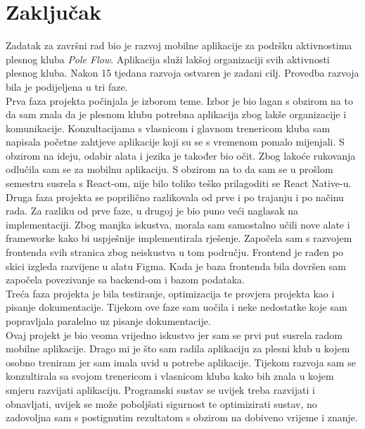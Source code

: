 \documentclass[times, utf8, zavrsni]{fer}
\begin{document}
\chapter{Zaključak}
    Zadatak za završni rad bio je razvoj mobilne aplikacije za podršku aktivnostima plesnog kluba \textit{Pole Flow}. Aplikacija služi lakšoj organizaciji svih aktivnosti plesnog kluba. Nakon 15 tjedana razvoja ostvaren je zadani cilj. Provedba razvoja bila je podijeljena u tri faze.\\
    Prva faza projekta počinjala je izborom teme. Izbor je bio lagan s obzirom na to da sam znala da je plesnom klubu potrebna aplikacija zbog lakše organizacije i komunikacije. Konzultacijama s vlasnicom i glavnom trenericom kluba sam napisala početne zahtjeve aplikacije koji su se s vremenom pomalo mijenjali. S obzirom na ideju, odabir alata i jezika je također bio očit. Zbog lakoće rukovanja odlučila sam se za mobilnu aplikaciju. S obzirom na to da sam se u prošlom semestru susrela s React-om, nije bilo toliko teško prilagoditi se React Native-u.\\
    Druga faza projekta se poprilično razlikovala od prve i po trajanju i po načinu rada. Za razliku od prve faze, u drugoj je bio puno veći naglasak na implementaciji. Zbog manjka iskustva, morala sam samostalno učili nove alate i frameworke kako bi uspješnije implementirala rješenje. Započela sam s razvojem frontenda svih stranica zbog neiskustva u tom području. Frontend je rađen po skici izgleda razvijene u alatu Figma. Kada je baza frontenda bila dovršen sam započela povezivanje sa backend-om i bazom podataka.\\
    Treća faza projekta je bila testiranje, optimizacija te provjera projekta kao i pisanje dokumentacije. Tijekom ove faze sam uočila i neke nedostatke koje sam popravljala paralelno uz pisanje dokumentacije.\\
    Ovaj projekt je bio veoma vrijedno iskustvo jer sam se prvi put susrela radom mobilne aplikacije. Drago mi je što sam radila aplikaciju za plesni klub u kojem osobno treniram jer sam imala uvid u potrebe aplikacije. Tijekom razvoja sam se konzultirala sa svojom trenericom i vlasnicom kluba kako bih znala u kojem smjeru razvijati aplikaciju. Programski sustav se uvijek treba razvijati i obnavljati, uvijek se može poboljšati sigurnost te optimizirati sustav, no zadovoljna sam s postignutim rezultatom s obzirom na dobiveno vrijeme i znanje.
    
     


		
\end{document}
